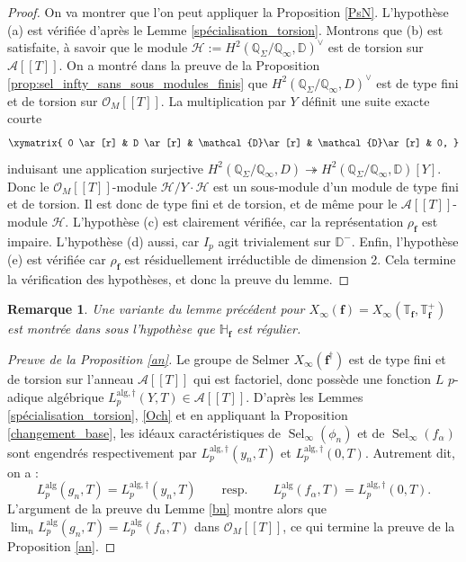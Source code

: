 \documentclass[12pt]{amsart}
\newcommand\bD{\mathbb{D}}
\newcommand\bQ{\mathbb{Q}}
\newcommand\bH{\mathbb{H}}
\newcommand\bT{\mathbb{T}}
\newcommand\cA{\mathcal{A}}
\newcommand\cD{\mathcal{D}}
\newcommand\cH{\mathcal{H}}
\newcommand\cO{\mathcal{O}}
\newcommand{\alg}{\textrm{alg}}
\DeclareMathOperator{\Sel}{Sel}
\theoremstyle{defstyle}
\newtheorem{remarque}[subsubsection]{Remarque}
\theoremstyle{thmstyle}
\begin{document}
\begin{proof}
	On va montrer que l'on peut appliquer la Proposition \ref{PsN}. L'hypothèse (a) est vérifiée d'après le Lemme \ref{spécialisation_torsion}. Montrons que (b) est satisfaite, à savoir que le module $\cH:=H^2(\bQ_\Sigma/\bQ_\infty,\bD)^\vee$ est de torsion sur $\cA[[T]]$. On a montré dans la preuve de la Proposition \ref{prop:sel_infty_sans_sous_modules_finis} que $H^2(\bQ_\Sigma/\bQ_\infty,D)^\vee$ est de type fini et de torsion sur $\cO_M[[T]]$. La multiplication par $Y$ définit une suite exacte courte 
	$$\xymatrix{ 0 \ar[r] & D \ar[r] & \cD \ar[r] & \cD \ar[r] &  0, }$$
	induisant une application surjective $H^2(\bQ_\Sigma/\bQ_\infty,D) \twoheadrightarrow H^2(\bQ_\Sigma/\bQ_\infty,\bD)[Y]$. Donc le $\cO_M[[T]]$-module $\cH/Y\cdot\cH$ est un sous-module d'un module de type fini et de torsion. Il est donc de type fini et de torsion, et de même pour le $\cA[[T]]$-module $\cH$. L'hypothèse (c) est clairement vérifiée, car la représentation $\rho_\textbf{f}$ est impaire. L'hypothèse (d) aussi, car $I_p$ agit trivialement sur $\bD^-$. Enfin, l'hypothèse (e) est vérifiée car $\rho_\textbf{f}$ est résiduellement irréductible de dimension 2. Cela termine la vérification des hypothèses, et donc la preuve du lemme.
\end{proof}
\begin{remarque}
	Une variante du lemme précédent pour $X_\infty(\textbf{f})=X_\infty(\bT_\textbf{f},\bT_\textbf{f}^+)$ est montrée dans \cite[Proposition 8.1]{ochiai2006two} sous l'hypothèse que $\bH_\textbf{f}$ est régulier.
\end{remarque}
\begin{proof}[Preuve de la Proposition \ref{an}]
	Le groupe de Selmer $X_\infty(\textbf{f}^\dag)$ est de type fini et de torsion sur l'anneau $\cA[[T]]$ qui est factoriel, donc possède une fonction $L$ $p$-adique algébrique $L_p^{\alg,\dag}(Y,T) \in \cA[[T]]$. D'après les Lemmes \ref{spécialisation_torsion}, \ref{Och} et en appliquant la Proposition \ref{changement_base}, les idéaux caractéristiques de $\Sel_\infty(\phi_n)$ et de $\Sel_\infty(f_\alpha)$ sont engendrés respectivement par $L^{\alg,\dag}_p(y_n,T)$ et $L_p^{\alg,\dag}(0,T)$. Autrement dit, on a :
	$$ L_p^{\alg}(g_n,T) = L^{\alg,\dag}_p(y_n,T) \qquad \textrm{resp.} \qquad L_p^{\alg}(f_\alpha,T)=L^{\alg,\dag}_p(0,T).$$
	L'argument de la preuve du Lemme \ref{bn} montre alors que $\lim_{n}L_p^{\alg}(g_n,T) = L_p^{\alg}(f_\alpha,T)$ dans $\cO_M[[T]]$, ce qui termine la preuve de la Proposition \ref{an}.
\end{proof}
\end{document}
